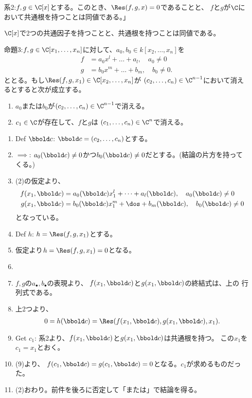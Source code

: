 系2:$f,g\in \C[x]$とする。このとき、$\Res(f,g,x)=0$であることと、
$f$と$g$が$\C$において共通根を持つことは同値である。」
\begin{myproof}
  $\C[x]$で2つの共通因子を持つことと、共通根を持つことは同値である。
\end{myproof}

命題3:$f,g\in \C[x_1,\dots,x_n]$に対して、$a_0,b_0\in k[x_2,\dots,x_n]$を
\begin{align}
  f &= a_0 x^l + \dots + a_l,\quad a_0\neq 0\\
  g &= b_0 x^m + \dots + b_m,\quad b_0\neq 0.
\end{align}
ととる。もし$\Res(f,g,x_1) \in \C[x_2,\dots,x_n]$が
$(c_2,\dots,c_n)\in \C^{n-1}$において消えるとすると次が成立する。
\begin{enumerate}[label=(\roman*)]
  \item $a_0$または$b_0$が$(c_2,\dots,c_n)\in \C^{n-1}$で消える。
  \item $c_1 \in \C$が存在して、$f$と$g$は
  $(c_1,\dots,c_n)\in \C^n$で消える。
\end{enumerate}
\begin{myproof}
  \begin{enumerate}[label=(\arabic*)]
    \item Def $\bbold c$: $\bbold c = (c_2,\dots,c_n)$とする。
    \item $\implies$: $a_0(\bbold c)\neq 0$かつ$b_0(\bbold c)\neq 0$だとする。(結論の片方を持ってくる。)
    \item
    (2)の仮定より、
    \begin{align}
      f(x_1,\bbold c)&=
      a_0(\bbold c)x_1^l + \dots + a_l(\bbold c),\quad a_0(\bbold c)\neq 0\\
      g(x_1,\bbold c)&=
      b_0(\bbold c)x_1^m + \dos + b_m(\bbold c),\quad b_0(\bbold c)\neq 0
    \end{align}
    となっている。
    \item
    Def $h$: $h=\Res(f,g,x_1)$とする。
    \item
    仮定より$h = \Res(f,g,x_1) = 0$となる。
    \item
    \item
    $f,g$の$a_\bullet,b_\bullet$の表現より、
    $f(x_1,\bbold c)$と$g(x_1,\bbold c)$の終結式は、上の
    行列式である。
    \item 上2つより、
    \begin{align}
      0 = h(\bbold c) = \Res(f(x_1,\bbold c),g(x_1,\bbold c),x_1).
    \end{align}
    \item Get $c_1$:
    系2より、$f(x_1,\bbold c)$と$g(x_1,\bbold c)$は共通根を持つ。
    この$x_1$を$c_1 = x_1$とおく。
    \item
    (9)より、
    $f(c_1,\bbold c) = g(c_1,\bbold c) = 0$となる。$c_1$が求めるものだった。
    \item (2)おわり。前件を後ろに否定して「または」で結論を得る。
  \end{enumerate}
\end{myproof}

